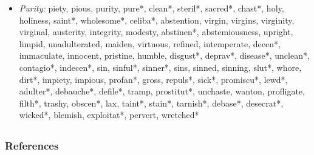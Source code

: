 \documentclass{beamer}
\begin{document}
\begin{frame}
\begin{tiny}
\begin{itemize}
      \item \emph{Purity:} piety, pious, purity, pure*, clean*, steril*, sacred*, chast*, holy, holiness, saint*, wholesome*, celiba*, abstention, virgin, virgins, virginity, virginal, austerity, integrity, modesty, abstinen*, abstemiousness, upright, limpid, unadulterated, maiden, virtuous, refined, intemperate, decen*, immaculate, innocent, pristine, humble, disgust*, deprav*, disease*, unclean*, contagio*, indecen*, sin, sinful*, sinner*, sins, sinned, sinning, slut*, whore, dirt*, impiety, impious, profan*, gross, repuls*, sick*, promiscu*, lewd*, adulter*, debauche*, defile*, tramp, prostitut*, unchaste, wanton, profligate, filth*, trashy, obscen*, lax, taint*, stain*, tarnish*, debase*, desecrat*, wicked*, blemish, exploitat*, pervert, wretched*
    \end{itemize}
  \end{tiny}
\end{frame}

\subsection{}
\begin{frame}
  \frametitle{References}
  \def\newblock{\hskip .11em plus .33em minus .07em}
  \begin{scriptsize}
    
    
  \end{scriptsize}
\end{frame}
\end{document}

